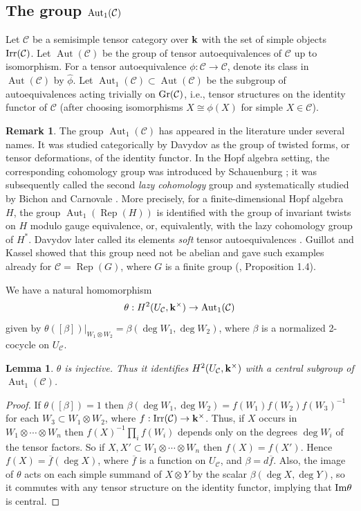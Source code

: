 \documentclass[12pt]{amsart}
\numberwithin{equation}{section}
\newtheorem{lemma}[theorem]{Lemma}
\theoremstyle{definition}
\newtheorem{remark}[theorem]{Remark}
\newcommand{\Aut}{\text{Aut}}
\newcommand{\Rep}{\text{Rep}}
\newcommand{\1}{_{(1)}}
\newcommand{\2}{_{(2)}}
\newcommand{\3}{_{(3)}}
\newcommand{\4}{_{(4)}}
\newcommand{\5}{_{(5)}}
\newcommand{\6}{_{(6)}}
\newcommand{\C}{\mathcal{C}}
\theoremstyle{plain}
\theoremstyle{definition}
\theoremstyle{remark}
\def\C{\mathcal{C}}
\def\Aut{\mathop{\mathrm{Aut}}\nolimits}
\def\Rep{\mathop{\mathrm{Rep}}\nolimits}
\begin{document}
\subsection{The group ${\rm Aut}_1(\C)$}
Let $\C$ be a semisimple tensor category over $\bold k$ with the set of simple objects ${\rm Irr}(\C)$. Let 
$\Aut(\C)$ be the group of tensor autoequivalences of $\C$ up to isomorphism. For a tensor autoequivalence $\phi:\C\to \C$, denote its class in $\Aut(\C)$ by $\widehat\phi$. Let $\Aut_1(\C)\subset \Aut(\C)$ be the subgroup of autoequivalences acting trivially on ${\rm Gr}(\C)$, i.e., 
tensor structures on the identity functor of $\C$ (after choosing isomorphisms $X\cong \phi(X)$ for simple $X\in \C$).

\begin{remark}\label{softaut}
The group $\Aut_1(\C)$ has appeared in the literature under several names. It was studied categorically by Davydov \cite{D1,D2} as the group of twisted forms, or tensor deformations, of the identity functor. In the Hopf algebra setting, the corresponding cohomology group was introduced by Schauenburg \cite{S}; it was subsequently called the second \emph{lazy cohomology} group and systematically studied by Bichon and Carnovale \cite{BC}. More precisely, for a finite-dimensional Hopf algebra $H$, the group $\Aut_1(\Rep(H))$ is identified with the group of invariant twists on $H$ modulo gauge equivalence, or, equivalently, with the lazy cohomology group of $H^*$. Davydov later called its elements \emph{soft} tensor autoequivalences \cite{D3}. Guillot and Kassel \cite{GK} showed that this group need not be abelian and gave such examples already for $\C=\Rep(G)$, where $G$ is a finite group (\cite{GK}, Proposition 1.4).
\end{remark}

We have a natural homomorphism
$$
\theta: H^2(U_\C,\bold k^\times)\to \Aut_1(\C)
$$ 
given by $\theta([\beta])|_{W_1\otimes W_2}=\beta(\deg W_1,\deg W_2)$, where $\beta$ is a normalized 2-cocycle on $U_\C$.  

\begin{lemma}\label{inje}  $\theta$ is injective. Thus it identifies $H^2(U_\C,\bold k^\times)$ 
with a central subgroup of $\Aut_1(\C)$.
\end{lemma}

\begin{proof} If $\theta([\beta])=1$ then $\beta(\deg W_1,\deg W_2)=f(W_1)f(W_2)f(W_3)^{-1}$ for each $W_3\subset W_1\otimes W_2$, where $f: {\rm Irr}(\C)\to \bold k^\times$. Thus, if $X$ occurs in $W_1\otimes\cdots\otimes W_n$ then 
$f(X)^{-1}\prod_i f(W_i)$ depends only on the degrees $\deg W_i$ of the tensor factors. So if $X,X'\subset W_1\otimes\cdots\otimes W_n$ then $f(X)=f(X')$. Hence $f(X)=\overline{f}(\deg X)$, where $\overline{f}$ is a function on $U_\C$, and $\beta=d\overline{f}$. Also, the image of $\theta$ acts on each simple summand of $X\otimes Y$ by the scalar $\beta(\deg X,\deg Y)$, so it commutes with any tensor structure on the identity functor, implying that ${\rm Im}\theta$ is central.
\end{proof} 
\end{document}
